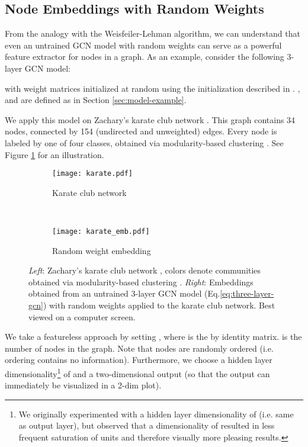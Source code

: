 \documentclass{article} \usepackage{iclr2017_conference,times}
\makeatletter
\newcommand*{\ie}{i.e.\@\xspace}
\newcommand*{\eq}{Eq.\@\xspace}
\makeatother
\begin{document}
\subsection{Node Embeddings with Random Weights}
From the analogy with the Weisfeiler-Lehman algorithm, we can understand that even an untrained GCN model with random weights can serve as a powerful feature extractor for nodes in a graph. As an example, consider the following 3-layer GCN model:

with weight matrices  initialized at random using the initialization described in \cite{glorot2010understanding}. ,  and  are defined as in Section \ref{sec:model-example}.

We apply this model on Zachary's karate club network \citep{zachary1977information}. This graph contains 34 nodes, connected by 154 (undirected and unweighted) edges. Every node is labeled by one of four classes, obtained via modularity-based clustering \citep{brandes2008modularity}. See Figure \ref{fig:karate-club-a} for an illustration.

\begin{figure}[htbp]
\centering
\begin{subfigure}[b]{0.5\textwidth}
    \centering
    \texttt{[image: karate.pdf]}
    \caption{Karate club network}
    \label{fig:karate-club-a}
\end{subfigure}~
\begin{subfigure}[b]{0.5\textwidth}
    \centering
    \texttt{[image: karate\_emb.pdf]}
    \caption{Random weight embedding}
    \label{fig:karate-club-b}
\end{subfigure}
\caption{\textit{Left}: Zachary's karate club network \citep{zachary1977information}, colors denote communities obtained via modularity-based clustering \citep{brandes2008modularity}. \textit{Right}: Embeddings obtained from an untrained 3-layer GCN model (\eq \ref{eq:three-layer-gcn}) with random weights applied to the karate club network. Best viewed on a computer screen.}
\label{fig:karate-club}
\end{figure}

We take a featureless approach by setting , where  is the  by  identity matrix.  is the number of nodes in the graph. Note that nodes are randomly ordered (\ie ordering contains no information). Furthermore, we choose a hidden layer dimensionality\footnote{We originally experimented with a hidden layer dimensionality of  (\ie same as output layer), but observed that a dimensionality of  resulted in less frequent saturation of  units and therefore visually more pleasing results.} of  and a two-dimensional output (so that the output can immediately be visualized in a 2-dim plot).
\end{document}
